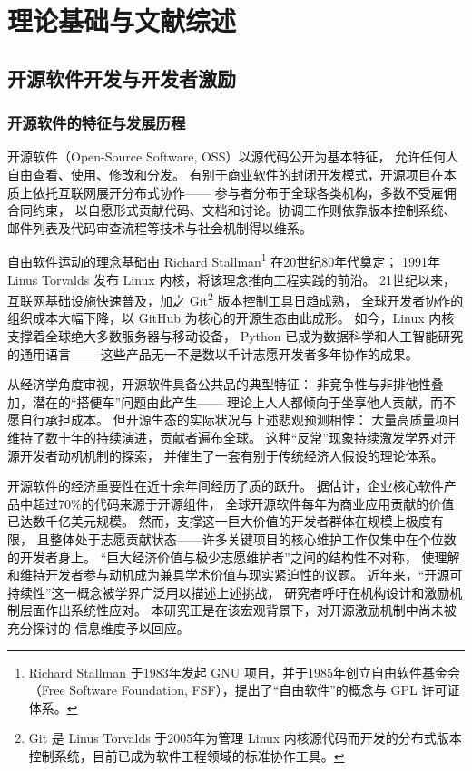 \chapter{理论基础与文献综述}

\section{开源软件开发与开发者激励}

\subsection{开源软件的特征与发展历程}

开源软件（Open-Source Software, OSS）以源代码公开为基本特征，
允许任何人自由查看、使用、修改和分发\cite{lakhani2003open}。
有别于商业软件的封闭开发模式，开源项目在本质上依托互联网展开分布式协作——
参与者分布于全球各类机构，多数不受雇佣合同约束，
以自愿形式贡献代码、文档和讨论。协调工作则依靠版本控制系统、
邮件列表及代码审查流程等技术与社会机制得以维系。

自由软件运动的理念基础由 Richard Stallman\footnote{Richard Stallman 于1983年发起 GNU 项目，并于1985年创立自由软件基金会（Free Software Foundation, FSF），提出了“自由软件”的概念与 GPL 许可证体系。} 在20世纪80年代奠定；
1991年 Linus Torvalds 发布 Linux 内核，将该理念推向工程实践的前沿。
21世纪以来，互联网基础设施快速普及，加之 Git\footnote{Git 是 Linus Torvalds 于2005年为管理 Linux 内核源代码而开发的分布式版本控制系统，目前已成为软件工程领域的标准协作工具。} 版本控制工具日趋成熟，
全球开发者协作的组织成本大幅下降，以 GitHub 为核心的开源生态由此成形。
如今，Linux 内核支撑着全球绝大多数服务器与移动设备，
Python 已成为数据科学和人工智能研究的通用语言——
这些产品无一不是数以千计志愿开发者多年协作的成果。

从经济学角度审视，开源软件具备公共品的典型特征：
非竞争性与非排他性叠加，潜在的“搭便车”问题由此产生——
理论上人人都倾向于坐享他人贡献，而不愿自行承担成本\cite{lerner2002simple}。
但开源生态的实际状况与上述悲观预测相悖：
大量高质量项目维持了数十年的持续演进，贡献者遍布全球。
这种“反常”现象持续激发学界对开源开发者动机机制的探索\cite{gerosa2021shifting}，
并催生了一套有别于传统经济人假设的理论体系。

开源软件的经济重要性在近十余年间经历了质的跃升。
据估计，企业核心软件产品中超过70\%的代码来源于开源组件，
全球开源软件每年为商业应用贡献的价值已达数千亿美元规模。
然而，支撑这一巨大价值的开发者群体在规模上极度有限，
且整体处于志愿贡献状态——许多关键项目的核心维护工作仅集中在个位数的开发者身上\cite{lu2021core,jamieson2024predicting}。
“巨大经济价值与极少志愿维护者”之间的结构性不对称，
使理解和维持开发者参与动机成为兼具学术价值与现实紧迫性的议题。
近年来，“开源可持续性”这一概念被学界广泛用以描述上述挑战，
研究者呼吁在机构设计和激励机制层面作出系统性应对\cite{alami2024sustainability,wang2025opensource,qi2021opensource}。
本研究正是在该宏观背景下，对开源激励机制中尚未被充分探讨的
信息维度予以回应。

